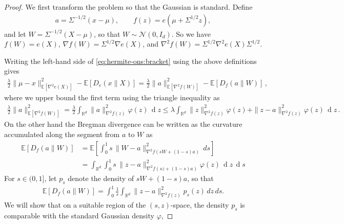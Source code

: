 \documentclass{article}
\theoremstyle{plain}
\theoremstyle{definition}
\theoremstyle{plain}
\newcommand{\R}{\mathbb R}
\newcommand{\E}{\mathbb E}
\newcommand{\cN}{\mathcal N}
\renewcommand{\d}[1]{\operatorname{d}\!#1}
\begin{document}
\begin{proof}
    We first transform the problem so that the Gaussian is standard.
    Define
    \begin{align}
        a=\Sigma^{-1/2}(x - \mu),
        \qquad
        f(z)=e(\mu+\Sigma^{1/2}z),
    \end{align}
    and let $W = \Sigma^{-1/2}(X-\mu)$, so that $W\sim\cN(0,I_d)$.
    So we have $f(W)=e(X)$, $\nabla f(W)=\Sigma^{1/2}\nabla e(X)$, and $\nabla^2 f(W)=\Sigma^{1/2}\nabla^2 e(X)\Sigma^{1/2}$.

    Writing the left-hand side of \eqref{eq:hermite-ons:bracket} using the above definitions gives
    \begin{align}
        \frac{\lambda}{2}\|\mu-x\|_{\E[\nabla^2e(X)]}^2
        -\E[D_e(x\|X)]
        =
        \frac{\lambda}{2}\|a\|_{\E[\nabla^2f(W)]}^2
        -\E[D_f(a\|W)]\,,
    \end{align}
    where we upper bound the first term using the triangle inequality as
    \begin{align}
        \frac{\lambda}{2}
        \| a \|_{\E[\nabla^2 f(W)]}^2
        =
        \frac{\lambda}{2}
        \int_{\R^d} \|a\|_{\nabla^2 f(z)}^2 \varphi(z)\,\d z
        \leq
        \lambda
        \int_{\R^d} \|z\|_{\nabla^2 f(z)}^2 \varphi(z)
        +
        \|z - a\|_{\nabla^2 f(z)}^2 \varphi(z)\,\d z\,.
        \label{eq:bracket-triangle}
    \end{align}
    On the other hand the Bregman divergence can be written as the curvature accumulated
    along the segment from $a$ to $W$ as
    \begin{align}
        \E[D_f(a\|W)]
         & =
        \E\left[
        \int_0^1
        s\,
        \|W - a\|_{\nabla^2f(sW + (1-s)a)}^2
        \,ds
        \right]
        \\
         & =
        \int_{\R^d}
        \int_0^1
        s\,
        \|z - a\|_{\nabla^2f(sz + (1-s)a)}^2
        \varphi(z)
        \,\d z
        \,\d s
        \label{eq:bracket-bregman-integral}
    \end{align}
    For $s\in(0,1]$, let $p_s$ denote the density of
    $sW + (1-s) a$, so that
    \begin{align}
        \E[D_f(a\|W)]
        =
        \int_0^1\frac{1}{s}
        \int_{\R^d}
        \|z - a\|_{\nabla^2f(z)}^2
        p_s(z)\,dz\,ds.
        \label{eq:bracket-density-integral}
    \end{align}
    We will show that on a suitable region of the $(s,z)$-space, the density $p_s$ is comparable with the standard Gaussian density $\varphi$,

\end{proof}
\end{document}

